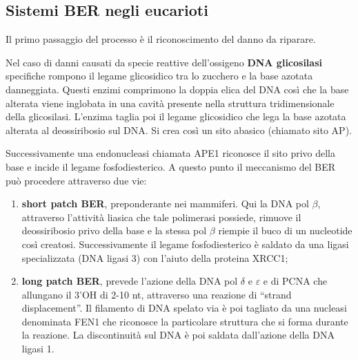 \documentclass[11pt]{book}
\begin{document}
\subsection{Sistemi BER negli
eucarioti}\label{sistemi-ber-negli-eucarioti}

Il primo passaggio del processo è il riconoscimento del danno da
riparare.

Nel caso di danni causati da specie reattive dell'ossigeno \textbf{DNA
glicosilasi} specifiche rompono il legame glicosidico tra lo zucchero e
la base azotata danneggiata. Questi enzimi comprimono la doppia elica
del DNA così che la base alterata viene inglobata in una cavità presente
nella struttura tridimensionale della glicosilasi. L'enzima taglia poi
il legame glicosidico che lega la base azotata alterata al deossiribosio
sul DNA. Si crea così un sito abasico (chiamato sito AP).

Successivamente una endonucleasi chiamata APE1 riconosce il sito privo
della base e incide il legame fosfodiesterico. A questo punto il
meccanismo del BER può procedere attraverso due vie:

\begin{enumerate}
\def\labelenumi{\arabic{enumi}.}
\itemsep1pt\parskip0pt
\item
  \textbf{short patch BER}, preponderante nei mammiferi. Qui la DNA pol
  \(\beta\), attraverso l'attività liasica che tale polimerasi possiede,
  rimuove il deossiribosio privo della base e la stessa pol \(\beta\)
  riempie il buco di un nucleotide così creatosi. Successivamente il
  legame fosfodiesterico è saldato da una ligasi specializzata (DNA
  ligasi 3) con l'aiuto della proteina XRCC1;
\item
  \textbf{long patch BER}, prevede l'azione della DNA pol \(\delta\) e
  \(\varepsilon\) e di PCNA che allungano il 3'OH di 2-10 nt, attraverso
  una reazione di ``strand displacement''. Il filamento di DNA spelato
  via è poi tagliato da una nucleasi denominata FEN1 che riconosce la
  particolare struttura che si forma durante la reazione. La
  discontinuità sul DNA è poi saldata dall'azione della DNA ligasi 1.
\end{enumerate}
\end{document}
